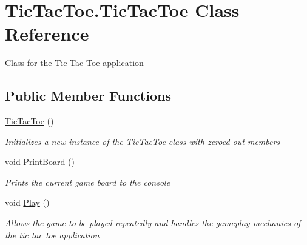 \hypertarget{class_tic_tac_toe_1_1_tic_tac_toe}{}\section{Tic\+Tac\+Toe.\+Tic\+Tac\+Toe Class Reference}
\label{class_tic_tac_toe_1_1_tic_tac_toe}


Class for the Tic Tac Toe application  


\subsection*{Public Member Functions}
\begin{DoxyCompactItemize}
\item 
\hyperlink{class_tic_tac_toe_1_1_tic_tac_toe_a3824d4169db029fc539683661dc558ee}{Tic\+Tac\+Toe} ()
\begin{DoxyCompactList}\small\item\em Initializes a new instance of the \hyperlink{class_tic_tac_toe_1_1_tic_tac_toe}{Tic\+Tac\+Toe} class with zeroed out members \end{DoxyCompactList}\item 
void \hyperlink{class_tic_tac_toe_1_1_tic_tac_toe_a96810a66e906f7d1c01928582707fd44}{Print\+Board} ()
\begin{DoxyCompactList}\small\item\em Prints the current game board to the console \end{DoxyCompactList}\item 
void \hyperlink{class_tic_tac_toe_1_1_tic_tac_toe_a5e506ff8851b71a18ccc16c04a9a6e4e}{Play} ()
\begin{DoxyCompactList}\small\item\em Allows the game to be played repeatedly and handles the gameplay mechanics of the tic tac toe application \end{DoxyCompactList}\end{DoxyCompactItemize}
